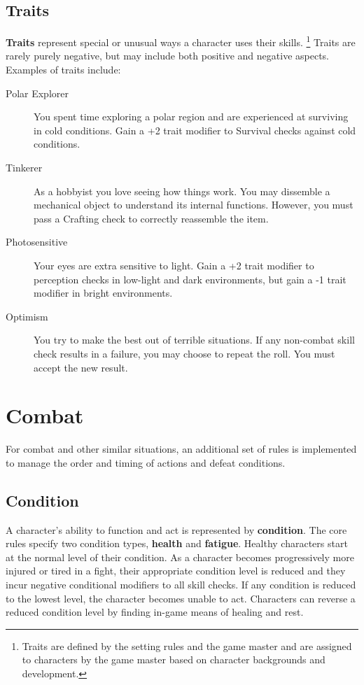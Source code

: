 \documentclass[11pt]{article}
\begin{document}
\subsection{Traits}
\textbf{Traits} represent special or unusual ways a character uses their skills.
\footnote{Traits are defined by the setting rules and the game master and are assigned to characters by the game master based on character backgrounds and development.}
Traits are rarely purely negative, but may include both positive and negative aspects.
Examples of traits include:

\begin{description}
	\item[Polar Explorer]You spent time exploring a polar region and are experienced at surviving in cold conditions. Gain a +2 trait modifier to Survival checks against cold conditions.
	\item[Tinkerer]As a hobbyist you love seeing how things work. You may dissemble a mechanical object to understand its internal functions. However, you must pass a Crafting check to correctly reassemble the item.
	\item[Photosensitive]Your eyes are extra sensitive to light. Gain a +2 trait modifier to perception checks in low-light and dark environments, but gain a -1 trait modifier in bright environments.
	\item[Optimism]You try to make the best out of terrible situations. If any non-combat skill check results in a failure, you may choose to repeat the roll. You must accept the new result.
\end{description}

\section{Combat}
For combat and other similar situations, an additional set of rules is implemented to manage the order and timing of actions and defeat conditions.

\subsection{Condition}
A character's ability to function and act is represented by \textbf{condition}.
The core rules specify two condition types, \textbf{health} and \textbf{fatigue}.
Healthy characters start at the normal level of their condition.
As a character becomes progressively more injured or tired in a fight, their appropriate condition level is reduced and they incur negative conditional modifiers to all skill checks.
If any condition is reduced to the lowest level, the character becomes unable to act.
Characters can reverse a reduced condition level by finding in-game means of healing and rest.
\end{document}
